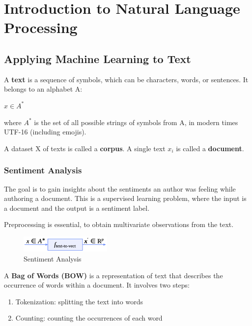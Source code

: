 \chapter{Introduction to Natural Language Processing}

\section{Applying Machine Learning to Text}

\begin{definitionblock}[Text]
A \textbf{text} is a sequence of symbols, which can be characters, words, or sentences. It belongs to an alphabet A:
\begin{center}
    $x \in A^*$
\end{center} 
where $A^*$ is the set of all possible strings of symbols from A, in modern times UTF-16 (including emojis).
\end{definitionblock}

A dataset X of texts is called a \textbf{corpus}. A single text $x_i$ is called a \textbf{document}.

\subsection{Sentiment Analysis}

The goal is to gain insights about the sentiments an author was feeling while authoring a document.
This is a supervised learning problem, where the input is a document and the output is a sentiment label.

Preprocessing is essential, to obtain multivariate observations from the text. 

\begin{center}
    \begin{figure}[H]
        \centering
        \includegraphics[width=0.4\textwidth]{assets/fig39.png}
        \caption{Sentiment Analysis}
    \end{figure}
\end{center}

A \textbf{Bag of Words (BOW)} is a representation of text that describes the occurrence of words within a document. It involves two steps:
\begin{enumerate}
    \item Tokenization: splitting the text into words
    \item Counting: counting the occurrences of each word
\end{enumerate}

